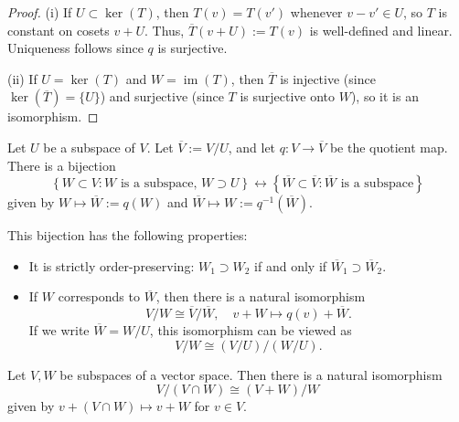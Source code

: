 \begin{proof}
  (i) If $U \subset \ker(T)$, then $T(v) = T(v')$ whenever $v - v' \in U$, so $T$ is constant on cosets $v + U$. Thus, $\overline{T}(v + U) := T(v)$ is well-defined and linear. Uniqueness follows since $q$ is surjective.

  (ii) If $U = \ker(T)$ and $W = \operatorname{im}(T)$, then $\overline{T}$ is injective (since $\ker(\overline{T}) = \{U\}$) and surjective (since $T$ is surjective onto $W$), so it is an isomorphism.
\end{proof}

\begin{proposition}
  Let $U$ be a subspace of $V$. Let $\overline{V} := V/U$, and let $q: V \to \overline{V}$ be the quotient map. There is a bijection
  \[
    \left\{
      W \subset V : W \text{ is a subspace},\, W \supset U
    \right\}
    \longleftrightarrow
    \left\{
      \overline{W} \subset \overline{V} : \overline{W} \text{ is a subspace}
    \right\}
  \]
  given by $W \mapsto \overline{W} := q(W)$ and $\overline{W} \mapsto W := q^{-1}(\overline{W})$.

  This bijection has the following properties:
  \begin{itemize}
    \item It is strictly order-preserving: $W_1 \supset W_2$ if and only if $\overline{W}_1 \supset \overline{W}_2$.
    \item If $W$ corresponds to $\overline{W}$, then there is a natural isomorphism
      \[
        V/W \cong \overline{V}/\overline{W}, \quad v + W \mapsto q(v) + \overline{W}.
      \]
      If we write $\overline{W} = W/U$, this isomorphism can be viewed as
      \[
        V/W \cong (V/U)/(W/U).
      \]
  \end{itemize}
\end{proposition}

\begin{proposition}
  Let $V, W$ be subspaces of a vector space. Then there is a natural isomorphism
  \[
    V / (V \cap W) \cong (V + W) / W
  \]
  given by $v + (V \cap W) \mapsto v + W$ for $v \in V$.
\end{proposition}
